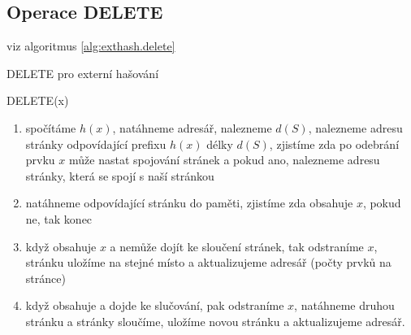 \subsection{Operace DELETE}

viz algoritmus \ref{alg:exthash.delete}

\begin{algorithm}[!htb]
\caption{DELETE pro externí hašování}
\label{alg:exthash.delete}
DELETE(x)
\begin{enumerate}
\item spočítáme $h(x)$, natáhneme adresář, nalezneme $d(S)$, nalezneme adresu
stránky odpovídající prefixu $h(x)$ délky $d(S)$, zjistíme zda po odebrání
prvku $x$ může nastat spojování stránek a pokud ano, nalezneme adresu
stránky, která se spojí s naší stránkou
\item natáhneme odpovídající stránku do paměti, zjistíme zda obsahuje $x$,
pokud ne, tak konec
\item když obsahuje $x$ a nemůže dojít ke sloučení stránek, tak odstraníme
$x$, stránku uložíme na stejné místo a aktualizujeme adresář (počty prvků na
stránce)
\item když obsahuje a dojde ke slučování, pak odstraníme $x$, natáhneme
druhou stránku a stránky sloučíme, uložíme novou stránku a aktualizujeme
adresář.
\end{enumerate}
\end{algorithm}

